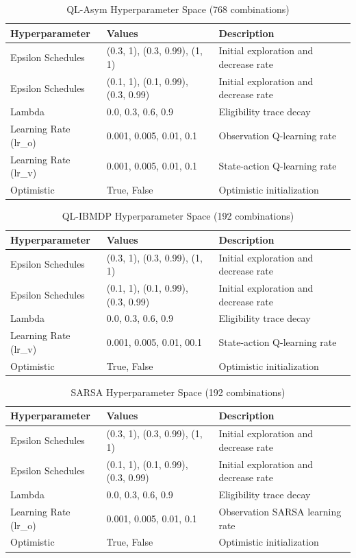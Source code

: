 \begin{table}
\small
\centering
\caption{QL-Asym Hyperparameter Space (768 combinations)}
\begin{tabular}{lll}
\toprule
\textbf{Hyperparameter} & \textbf{Values} & \textbf{Description} \\
\midrule
Epsilon Schedules & (0.3, 1), (0.3, 0.99), (1, 1) & Initial exploration and decrease rate \\
Epsilon Schedules & (0.1, 1), (0.1, 0.99), (0.3, 0.99) & Initial exploration and decrease rate \\
Lambda & 0.0, 0.3, 0.6, 0.9 & Eligibility trace decay \\
Learning Rate (lr\_o) & 0.001, 0.005, 0.01, 0.1 & Observation Q-learning rate \\
Learning Rate (lr\_v) & 0.001, 0.005, 0.01, 0.1 & State-action Q-learning rate \\
Optimistic & True, False & Optimistic initialization \\
\bottomrule
\end{tabular}
\end{table}

\begin{table}
\small
\centering
\caption{QL-IBMDP Hyperparameter Space (192 combinations)}
\begin{tabular}{lll}
\toprule
\textbf{Hyperparameter} & \textbf{Values} & \textbf{Description} \\
\midrule
Epsilon Schedules & (0.3, 1), (0.3, 0.99), (1, 1) & Initial exploration and decrease rate \\
Epsilon Schedules & (0.1, 1), (0.1, 0.99), (0.3, 0.99) & Initial exploration and decrease rate \\
Lambda & 0.0, 0.3, 0.6, 0.9 & Eligibility trace decay \\
Learning Rate (lr\_v) & 0.001, 0.005, 0.01, 00.1 & State-action Q-learning rate \\
Optimistic & True, False & Optimistic initialization \\
\bottomrule
\end{tabular}
\end{table}

\begin{table}
\small
\centering
\caption{SARSA Hyperparameter Space (192 combinations)}
\begin{tabular}{lll}
\toprule
\textbf{Hyperparameter} & \textbf{Values} & \textbf{Description} \\
\midrule
Epsilon Schedules & (0.3, 1), (0.3, 0.99), (1, 1) & Initial exploration and decrease rate \\
Epsilon Schedules & (0.1, 1), (0.1, 0.99), (0.3, 0.99) & Initial exploration and decrease rate \\
Lambda & 0.0, 0.3, 0.6, 0.9 & Eligibility trace decay \\
Learning Rate (lr\_o) & 0.001, 0.005, 0.01, 0.1 & Observation SARSA learning rate \\
Optimistic & True, False & Optimistic initialization \\
\bottomrule
\end{tabular}
\end{table}


